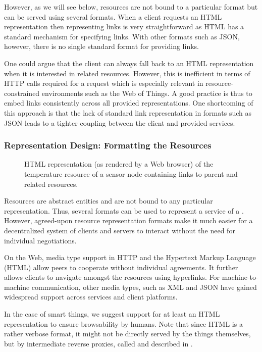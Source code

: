 However, as we will see below, resources are not bound to a particular format but can be served using several formats. When a client requests an HTML representation then representing links is very straightforward as HTML has a standard mechanism for specifying links. With other formats such as JSON, however, there is no single standard format for providing links.

One could argue that the client can always fall back to an HTML representation when it is interested in related resources. However, this is inefficient in terms of HTTP calls required for a request which is especially relevant in resource-constrained environments such as the Web of Things. A good practice is thus to embed links consistently across all provided representations. One shortcoming of this approach is that the lack of standard link representation in formats such as JSON leads to a tighter coupling between the client and provided services.


\subsubsection{Representation Design: Formatting the Resources}
\begin{figure}
\caption{HTML representation (as rendered by a Web browser) of the temperature resource of a sensor node containing links to parent and related resources.}
\label{fig:genericNodeHTML}
\end{figure}
Resources are abstract entities and are not bound to any particular representation. Thus, several formats can be used to represent a service of a \st{}. However, agreed-upon resource representation formats make it much easier for a decentralized system of clients and servers to interact without the need for individual negotiations. 

On the Web, media type support in HTTP and the Hypertext Markup Language (HTML) allow peers to cooperate without individual agreements. It further allows clients to navigate amongst the resources using hyperlinks. For machine-to-machine communication, other media types, such as XML and JSON have gained widespread support across services and client platforms.


In the case of smart things, we suggest support for at least an HTML representation to ensure browsability by humans. Note that since HTML is a rather verbose format, it might not be directly served by the things themselves, but by intermediate reverse proxies, called \sgs{} and described in . 

